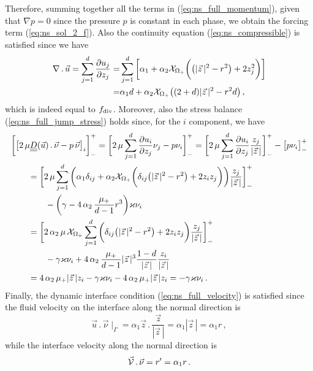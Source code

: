 Therefore, summing together all the terms in (\ref{eq:ns_full_momentum}),
given that $\nabla p = 0$  since the pressure $p$ is constant in each
phase, we obtain the forcing term (\ref{eq:ns_sol_2_f}). Also the
continuity equation (\ref{eq:ns_compressible}) is satisfied since we have
\begin{align*}
\nabla\,.\,\vec u=\sum_{j=1}^d\frac{\partial u_j}{\partial z_j} = &
\sum_{j=1}^d\bigg[ \alpha_1
+ \alpha_2\mathrm{\mathcal{X}}_{\Omega_+}\bigg(\big(|\vec z\,|^2-r^2\big)
+ 2z_j^2\bigg)\bigg]\\
= & \alpha_1d + \alpha_2\mathrm{\mathcal{X}}_{\Omega_+}\big((2+d)|\vec z\,|^2-r^2d\big)\,,
\end{align*}
which is indeed equal to $f_{\rm{div}}$. Moreover, also the stress balance
(\ref{eq:ns_full_jump_stress}) holds since, for the
$i$ component, we have
\begin{align*}
& \bigg[\big[2\,\mu \mat D(\vec u)\,.\,\vec\nu - p\,\vec \nu\big]_i\bigg]_-^+ =
\bigg[2\,\mu \sum_{j=1}^d\frac{\partial u_i}{\partial z_j}\nu_j
- p\nu_i\bigg]_-^+
= \bigg[2\,\mu\sum_{j=1}^d\frac{\partial u_i}{\partial z_j}
\frac{z_j}{|\vec z\,|}\bigg]_-^+ -\big[ p\nu_i\big]_-^+ \\
& \qquad = \bigg[2\,\mu\sum_{j=1}^d
\bigg(\alpha_1 \delta_{ij}
+ \alpha_2\charfcn{\Omega_+}\bigg(\delta_{ij}\big(|\vec z\,|^2-r^2\big)
+ 2z_iz_j\bigg)\bigg)\frac{z_j}{|\vec z\,|}\bigg]_-^+ \\
& \qquad \qquad
- \bigg(\gamma - 4\,\alpha_2\,\frac{\mu_+}{d-1}r^3\bigg) \varkappa\nu_i \\
& \qquad = \bigg[2\,\alpha_2\,\mu\,\charfcn{\Omega_+}\sum_{j=1}^d
\bigg(\delta_{ij}\big(|\vec z\,|^2-r^2\big)
+ 2z_iz_j\bigg)\frac{z_j}{|\vec z\,|}\bigg]_-^+ \\
& \qquad \qquad -\gamma \varkappa \nu_i + 4\,\alpha_2\,\frac{\mu_+}{d-1}
|\vec z\,|^3 \frac{1-d}{|\vec z\,|}\frac{z_i}{|\vec z\,|} \\
& \qquad = 4\,\alpha_2\,\mu_+|\vec z\,|z_i -\gamma \varkappa \nu_i
- 4\,\alpha_2\,\mu_+ |\vec z\,|z_i = -\gamma \varkappa \nu_i\,.
\end{align*}
Finally, the dynamic interface condition (\ref{eq:ns_full_velocity}) is
satisfied since the fluid velocity on the interface along the normal direction
is
\begin{equation*}
\vec u\,.\,\vec \nu \!\mid_\Gamma=\alpha_1\vec z\,.\, \frac{\vec z}{|\vec z\,|}
= \alpha_1|\vec z\,|=\alpha_1 r\,,
\end{equation*}
while the interface velocity along the normal direction is
\begin{equation*}
\vec{\mathcal{V}}\,.\,\vec \nu=r^\prime=\alpha_1 r\,.
\end{equation*}


